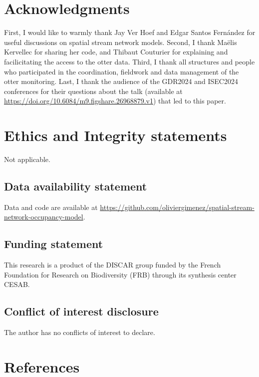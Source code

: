 \documentclass[
  11pt,
  a4paper,
]{article}
\begin{document}
\section{Acknowledgments}\label{acknowledgments}

First, I would like to warmly thank Jay Ver Hoef and Edgar Santos Fernández for useful discussions on spatial stream network models. Second, I thank Maëlis Kervellec for sharing her code, and Thibaut Couturier for explaining and facilicitating the access to the otter data. Third, I thank all structures and people who participated in the coordination, fieldwork and data management of the otter monitoring. Last, I thank the audience of the GDR2024 and ISEC2024 conferences for their questions about the talk (available at \url{https://doi.org/10.6084/m9.figshare.26968879.v1}) that led to this paper.

\section{Ethics and Integrity statements}\label{ethics-and-integrity-statements}

Not applicable.

\subsection{Data availability statement}\label{data-availability-statement}

Data and code are available at \href{https://github.com/oliviergimenez/spatial-stream-network-occupancy-model}{https://github.com/oliviergimenez/spatial-stream-network-occupancy-model}.

\subsection{Funding statement}\label{funding-statement}

This research is a product of the DISCAR group funded by the French Foundation for Research on Biodiversity (FRB) through its synthesis center CESAB.

\subsection{Conflict of interest disclosure}\label{conflict-of-interest-disclosure}

The author has no conflicts of interest to declare.

\section{References}\label{references}
\end{document}
